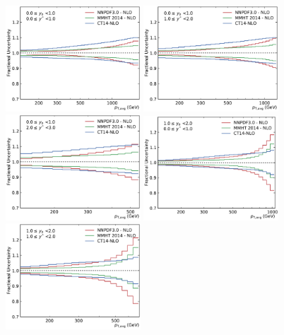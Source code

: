 \begin{figure}[htbp]
    \centering
    \includegraphics[width=0.45\textwidth]{figures/theory/pdf_unc_comparison_yb0ys0.pdf}\hfill
    \includegraphics[width=0.45\textwidth]{figures/theory/pdf_unc_comparison_yb0ys1.pdf}
    \includegraphics[width=0.45\textwidth]{figures/theory/pdf_unc_comparison_yb0ys2.pdf}\hfill
    \includegraphics[width=0.45\textwidth]{figures/theory/pdf_unc_comparison_yb1ys0.pdf}
    \includegraphics[width=0.45\textwidth]{figures/theory/pdf_unc_comparison_yb1ys1.pdf}\hfill

\end{figure}

